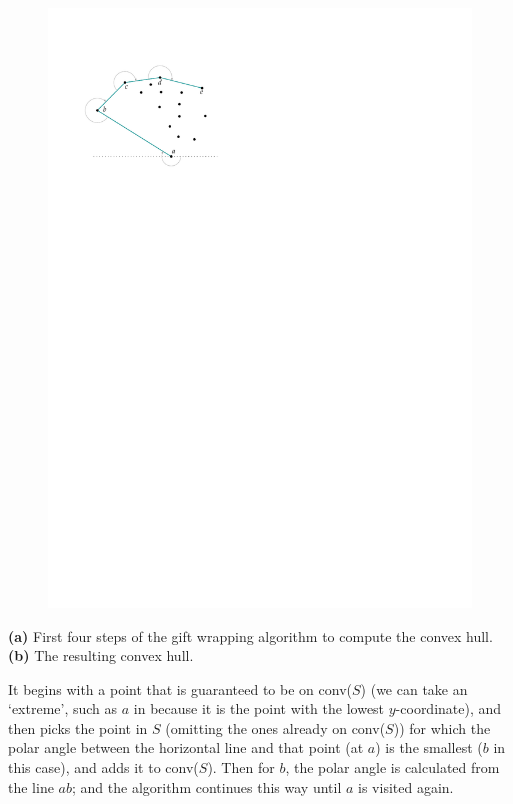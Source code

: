 \begin{marginfigure}
\begin{subfigure}[b]{\linewidth}
    \includegraphics[page=2,width=\textwidth]{figs/giftwrapping.pdf}
    \caption{}
  \end{subfigure}
  \caption{\textbf{(a)} First four steps of the gift wrapping algorithm to compute the convex hull. \textbf{(b)} The resulting convex hull.}%
\end{marginfigure}
It begins with a point that is guaranteed to be on conv($S$) (we can take an `extreme', such as $a$ in  because it is the point with the lowest $y$-coordinate), and then picks the point in $S$ (omitting the ones already on conv($S$)) for which the polar angle between the horizontal line and that point (at $a$) is the smallest ($b$ in this case), and adds it to conv($S$).
Then for $b$, the polar angle is calculated from the line $ab$; and the algorithm continues this way until $a$ is visited again.

